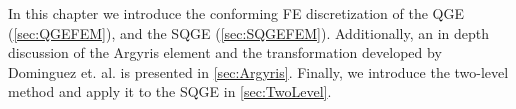 In this chapter we introduce the conforming FE discretization of the QGE
(\autoref{sec:QGEFEM}), and the SQGE (\autoref{sec:SQGEFEM}). Additionally, an
in depth discussion of the Argyris element and the transformation developed by
Dominguez et. al. \cite{Dominguez08} is presented in \autoref{sec:Argyris}.
Finally, we introduce the two-level method and apply it to the SQGE in
\autoref{sec:TwoLevel}.
